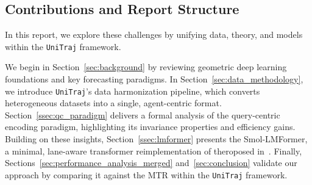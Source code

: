 \subsection{Contributions and Report Structure}
In this report, we explore these challenges by unifying data, theory, and models within the \texttt{UniTraj} framework.

 We begin in Section~\ref{sec:background} by reviewing geometric deep learning foundations and key forecasting paradigms. In Section~\ref{sec:data_methodology}, we introduce \texttt{UniTraj}'s data harmonization pipeline, which converts heterogeneous datasets into a single, agent-centric format. Section~\ref{ssec:qc_paradigm} delivers a formal analysis of the query-centric encoding paradigm, highlighting its invariance properties and efficiency gains. Building on these insights, Section~\ref{ssec:lmformer} presents the Smol-LMFormer, a minimal, lane-aware transformer reimplementation of theroposed in~\cite{lmformerYadav2025}. Finally, Sections~\ref{sec:performance_analysis_merged} and~\ref{sec:conclusion} validate our approach by comparing it against the MTR within the \texttt{UniTraj} framework.

\newpage